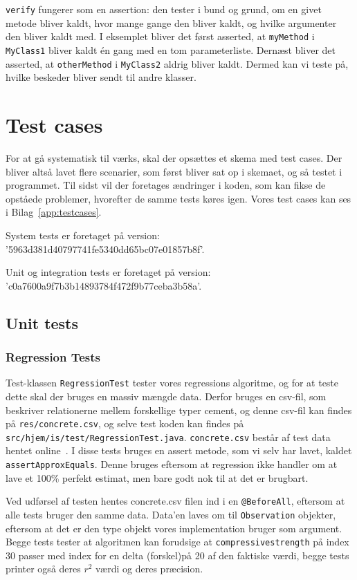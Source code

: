 \texttt{verify} fungerer som en assertion: den tester i bund og grund, om en givet metode bliver kaldt, hvor mange gange den bliver kaldt, og hvilke argumenter den bliver kaldt med. I eksemplet bliver det først asserted, at \texttt{myMethod} i \texttt{MyClass1} bliver kaldt én gang med en tom parameterliste. Dernæst bliver det asserted, at \texttt{otherMethod} i \texttt{MyClass2} aldrig bliver kaldt. Dermed kan vi teste på, hvilke beskeder bliver sendt til andre klasser.

\section{Test cases}
For at gå systematisk til værks, skal der opsættes et skema med test cases\cite{Heumann}. Der bliver altså lavet flere scenarier, som først bliver sat op i skemaet, og så testet i programmet. Til sidst vil der foretages ændringer i koden, som kan fikse de opståede problemer, hvorefter de samme tests køres igen. Vores test cases kan ses i Bilag~\ref{app:testcases}.

System tests er foretaget på version: '5963d381d40797741fe5340dd65bc07e01857b8f'.

Unit og integration tests er foretaget på version: 'c0a7600a9f7b3b14893784f472f9b77ceba3b58a'.

\subsection{Unit tests}
\subsubsection{Regression Tests}
Test-klassen \texttt{RegressionTest} tester vores regressions algoritme, og for at teste dette skal der bruges en massiv mængde data. Derfor bruges en csv-fil, som beskriver relationerne mellem forskellige typer cement, og denne csv-fil kan findes på \texttt{res/concrete.csv}, og selve test koden kan findes på \texttt{src/hjem/is/test/RegressionTest.java}. \texttt{concrete.csv} består af test data hentet online~\cite{ExampleSales}. I disse tests bruges en assert metode, som vi selv har lavet, kaldet \texttt{assertApproxEquals}. Denne bruges eftersom at regression ikke handler om at lave et 100\% perfekt estimat, men bare godt nok til at det er brugbart.

Ved udførsel af testen hentes concrete.csv filen ind i en \texttt{@BeforeAll}, eftersom at alle tests bruger den samme data. Data'en laves om til \texttt{Observation} objekter, eftersom at det er den type objekt vores implementation bruger som argument. Begge tests tester at algoritmen kan forudsige at \texttt{compressivestrength} på index 30 passer med index for en delta (forskel)på 20 af den faktiske værdi, begge tests printer også deres $r^{2}$ værdi og deres præcision.

